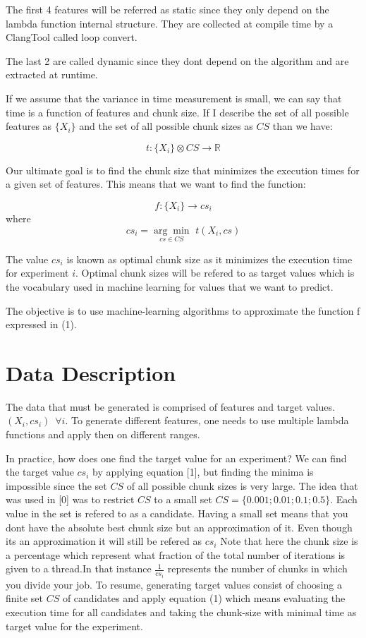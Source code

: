\documentclass[12pt]{article}
\begin{document}
The first 4 features will be referred as static since they only depend on the lambda function internal structure. They are collected at compile time by a ClangTool called loop convert.

The last 2 are called dynamic since they dont depend on the algorithm and are extracted at runtime.

If we assume that the variance in time measurement is small, we can say that time is a function of features and chunk size. If I describe the set of all possible features as $\{X_i\}$ and the set of all possible chunk sizes as $CS$ than we have:

$$t:\{X_i\} \otimes CS \rightarrow \mathbb{R}$$

Our ultimate goal is to find the chunk size that minimizes the execution times for a given set of features. This means that we want to find the function:

\begin{equation}
	f:\{X_i\}\rightarrow cs_i
\end{equation}
 where
\begin{equation}
 cs_i=\underset{cs \in CS}{\arg\min} \, \, t(X_i,cs)
\end{equation}

The  value $cs_i$ is known as optimal chunk size as it minimizes the execution time for experiment $i$. Optimal chunk sizes will be refered to as target values which is the vocabulary used in machine learning for values that we want to predict.

The objective is to use machine-learning algorithms to approximate the function f expressed in (1).

\section{Data Description}
The data that must be generated is comprised of features and target values. $(X_i,cs_i) \, \, \, \forall i$. To generate different features, one needs to use multiple lambda functions and apply then on different ranges.

In practice, how does one find the target value for an experiment? We can find the target value $cs_i$ by applying equation [1], but finding the minima is impossible since the set $CS$ of all possible chunk sizes is very large. The idea that was used in [0] was to restrict $CS$ to a small set
$CS=\{0.001;0.01;0.1;0.5\}$. Each value in the set is refered to as a candidate. Having a small set means that you dont have the absolute best chunk size but an approximation of it. Even though its an approximation it will still be refered as $cs_i$
Note that here the chunk size is a percentage which represent what fraction of the total number of iterations is given to a thread.In that instance $\frac{1}{cs_i}$ represents the number of chunks in which you divide your job. To resume, generating target values consist of choosing a finite set $CS$ of candidates and apply equation (1) which means evaluating the execution time for all candidates and taking the chunk-size with minimal time as target value for the experiment.
\end{document}
